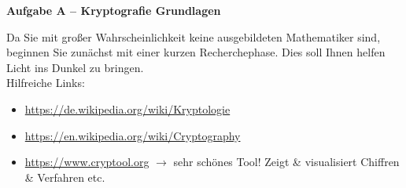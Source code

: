 \documentclass[paper=a4,fontsize=11pt]{scrartcl}%
\begin{document}
\begin{center}\Large{\textbf{Aufgabe A -- Kryptografie Grundlagen}}\end{center}\vskip0.25in
Da Sie mit großer Wahrscheinlichkeit keine ausgebildeten Mathematiker sind, beginnen Sie zunächst mit einer kurzen Recherchephase. Dies soll Ihnen helfen Licht ins Dunkel zu bringen.\\
Hilfreiche Links:
\begin{itemize}
	\item \url{https://de.wikipedia.org/wiki/Kryptologie}
	\item \url{https://en.wikipedia.org/wiki/Cryptography}
	\item \url{https://www.cryptool.org} $\rightarrow$ sehr schönes Tool! Zeigt \& visualisiert Chiffren \& Verfahren etc.
\end{itemize}
\end{document}
